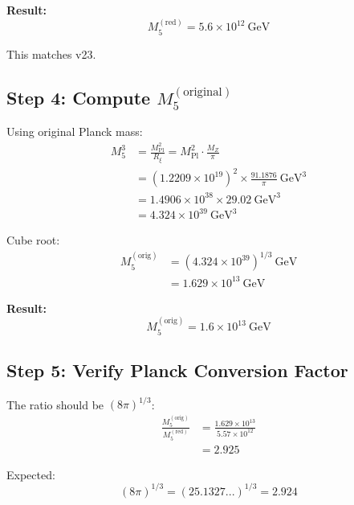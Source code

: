 \documentclass[11pt,a4paper]{article}
\newcommand{\Rxi}{R_\xi}
\newcommand{\Mpl}{M_{\mathrm{Pl}}}
\newcommand{\Mfive}{M_5}
\newcommand{\MZ}{M_Z}
\begin{document}
\textbf{Result:}
\begin{equation}
\boxed{\Mfive^{\mathrm{(red)}} = 5.6 \times 10^{12}~\mathrm{GeV}}
\label{eq:M5-red-boxed}
\end{equation}

This matches v23. \checkmark

\subsection{Step 4: Compute $\Mfive^{\mathrm{(original)}}$}

Using original Planck mass:
\begin{align}
\Mfive^3 &= \frac{\Mpl^2}{\Rxi} = \Mpl^2 \cdot \frac{\MZ}{\pi}
\label{eq:M5-orig-cubed}\\
&= (1.2209 \times 10^{19})^2 \times \frac{91.1876}{\pi}~\mathrm{GeV}^3 \label{eq:M5-orig-step1}\\
&= 1.4906 \times 10^{38} \times 29.02~\mathrm{GeV}^3 \label{eq:M5-orig-step2}\\
&= 4.324 \times 10^{39}~\mathrm{GeV}^3 \label{eq:M5-orig-step3}
\end{align}

Cube root:
\begin{align}
\Mfive^{\mathrm{(orig)}} &= (4.324 \times 10^{39})^{1/3}~\mathrm{GeV}
\label{eq:M5-orig-cuberoot}\\
&= 1.629 \times 10^{13}~\mathrm{GeV} \label{eq:M5-orig-final}
\end{align}

\textbf{Result:}
\begin{equation}
\boxed{\Mfive^{\mathrm{(orig)}} = 1.6 \times 10^{13}~\mathrm{GeV}}
\label{eq:M5-orig-boxed}
\end{equation}

\subsection{Step 5: Verify Planck Conversion Factor}

The ratio should be $(8\pi)^{1/3}$:
\begin{align}
\frac{\Mfive^{\mathrm{(orig)}}}{\Mfive^{\mathrm{(red)}}} &= \frac{1.629 \times 10^{13}}{5.57 \times 10^{12}}
\label{eq:M5-ratio-compute}\\
&= 2.925 \label{eq:M5-ratio-result}
\end{align}

Expected:
\begin{equation}
(8\pi)^{1/3} = (25.1327...)^{1/3} = 2.924
\label{eq:8pi-third-expected}
\end{equation}
\end{document}
